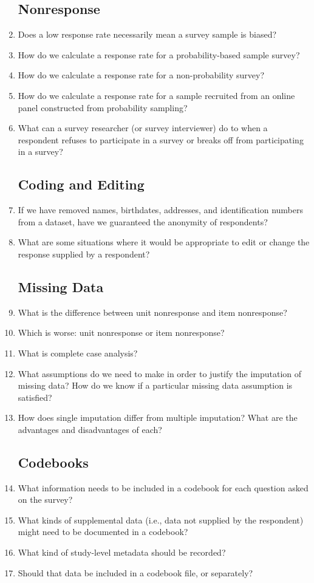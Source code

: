 \documentclass[12pt, a4]{article}
\begin{document}
\begin{enumerate}
\subsection*{Nonresponse}

\item Does a low response rate necessarily mean a survey sample is biased?
\item How do we calculate a response rate for a probability-based sample survey?
\item How do we calculate a response rate for a non-probability survey?
\item How do we calculate a response rate for a sample recruited from an online panel constructed from probability sampling?
\item What can a survey researcher (or survey interviewer) do to when a respondent refuses to participate in a survey or breaks off from participating in a survey?

\subsection*{Coding and Editing}

\item If we have removed names, birthdates, addresses, and identification numbers from a dataset, have we guaranteed the anonymity of respondents?
\item What are some situations where it would be appropriate to edit or change the response supplied by a respondent?

\subsection*{Missing Data}

\item What is the difference between unit nonresponse and item nonresponse?
\item Which is worse: unit nonresponse or item nonresponse?
\item What is complete case analysis?
\item What assumptions do we need to make in order to justify the imputation of missing data? How do we know if a particular missing data assumption is satisfied?
\item How does single imputation differ from multiple imputation? What are the advantages and disadvantages of each?

\subsection*{Codebooks}

\item What information needs to be included in a codebook for each question asked on the survey?
\item What kinds of supplemental data (i.e., data not supplied by the respondent) might need to be documented in a codebook?
\item What kind of study-level metadata should be recorded?
\item Should that data be included in a codebook file, or separately?

\end{enumerate}
\end{document}
